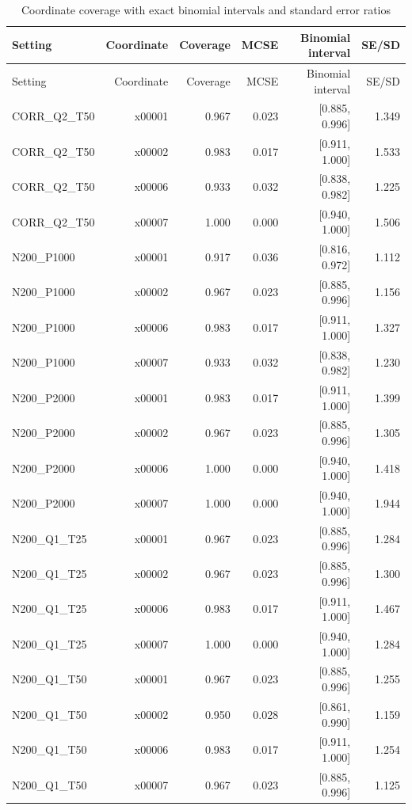 \begin{longtable}{lrrrrr}
\caption{Coordinate coverage with exact binomial intervals and standard error ratios}\label{tab:joint-coordinate}\\
\toprule
Setting & Coordinate & Coverage & MCSE & Binomial interval & SE/SD \\
\midrule\endfirsthead
\toprule
Setting & Coordinate & Coverage & MCSE & Binomial interval & SE/SD \\
\midrule\endhead
CORR\_Q2\_T50 & x00001 & 0.967 & 0.023 & [0.885, 0.996] & 1.349 \\
CORR\_Q2\_T50 & x00002 & 0.983 & 0.017 & [0.911, 1.000] & 1.533 \\
CORR\_Q2\_T50 & x00006 & 0.933 & 0.032 & [0.838, 0.982] & 1.225 \\
CORR\_Q2\_T50 & x00007 & 1.000 & 0.000 & [0.940, 1.000] & 1.506 \\
N200\_P1000 & x00001 & 0.917 & 0.036 & [0.816, 0.972] & 1.112 \\
N200\_P1000 & x00002 & 0.967 & 0.023 & [0.885, 0.996] & 1.156 \\
N200\_P1000 & x00006 & 0.983 & 0.017 & [0.911, 1.000] & 1.327 \\
N200\_P1000 & x00007 & 0.933 & 0.032 & [0.838, 0.982] & 1.230 \\
N200\_P2000 & x00001 & 0.983 & 0.017 & [0.911, 1.000] & 1.399 \\
N200\_P2000 & x00002 & 0.967 & 0.023 & [0.885, 0.996] & 1.305 \\
N200\_P2000 & x00006 & 1.000 & 0.000 & [0.940, 1.000] & 1.418 \\
N200\_P2000 & x00007 & 1.000 & 0.000 & [0.940, 1.000] & 1.944 \\
N200\_Q1\_T25 & x00001 & 0.967 & 0.023 & [0.885, 0.996] & 1.284 \\
N200\_Q1\_T25 & x00002 & 0.967 & 0.023 & [0.885, 0.996] & 1.300 \\
N200\_Q1\_T25 & x00006 & 0.983 & 0.017 & [0.911, 1.000] & 1.467 \\
N200\_Q1\_T25 & x00007 & 1.000 & 0.000 & [0.940, 1.000] & 1.284 \\
N200\_Q1\_T50 & x00001 & 0.967 & 0.023 & [0.885, 0.996] & 1.255 \\
N200\_Q1\_T50 & x00002 & 0.950 & 0.028 & [0.861, 0.990] & 1.159 \\
N200\_Q1\_T50 & x00006 & 0.983 & 0.017 & [0.911, 1.000] & 1.254 \\
N200\_Q1\_T50 & x00007 & 0.967 & 0.023 & [0.885, 0.996] & 1.125 \\

\end{longtable}
